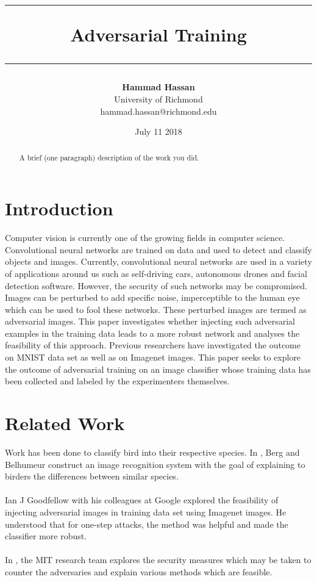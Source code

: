 \documentclass[11pt]{article}
\title {\vspace{-3cm}
		\rule{\textwidth}{2.0pt}
		\textbf{Adversarial Training}
		\rule{\textwidth}{0.5pt}
}
\author{
  \textbf{Hammad Hassan} \\
  University of Richmond \\
  hammad.hassan@richmond.edu
}
\date{July 11 2018}
\begin{document}
\maketitle
\begin{abstract}
  A brief (one paragraph) description of the work you did.
\end{abstract}


\section{Introduction}
Computer vision is currently one of the growing fields in computer science. Convolutional neural networks are trained on data and used to detect and classify objects and images. Currently, convolutional neural networks are used in a variety of applications around us such as self-driving cars, autonomous drones and facial detection software. However, the security of such networks may be compromised. Images can be perturbed to add specific noise, imperceptible to the human eye which can be used to fool these networks. These perturbed images are termed as adversarial images. This paper investigates whether injecting such adversarial examples in the training data leads to a more robust network and analyses the feasibility of this approach. Previous researchers have investigated the outcome on MNIST data set as well as on Imagenet images. This paper seeks to explore the outcome of adversarial training on an image classifier whose training data has been collected and labeled by the experimenters themselves. 


\section{Related Work}

Work has been done to classify bird into their respective species. In \cite{berg2013you}, Berg and Belhumeur construct an image recognition
system with the goal of explaining to birders the differences between similar species. \\ \\
Ian J Goodfellow with his colleagues at Google \cite{kurakin2016adversarial} explored the feasibility of injecting adversarial images in training data set using Imagenet images. He understood that for one-step attacks, the method was helpful and made the classifier more robust. \\ \\
In \cite{madry2017towards}, the MIT research team explores the security measures which may be taken to counter the adversaries and explain various methods which are feasible.
\end{document}
